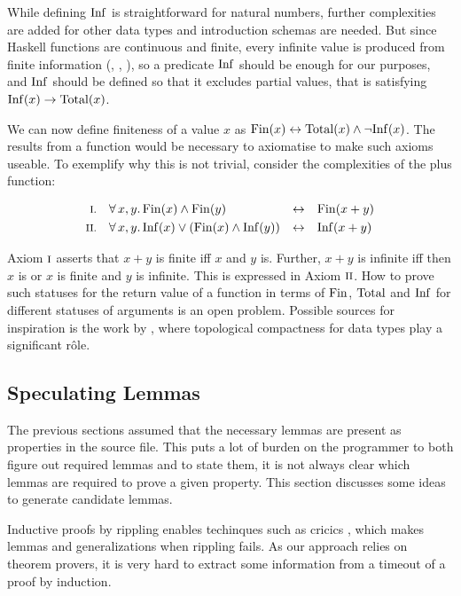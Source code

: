 While defining $\mathrm{Inf}$ is straightforward for natural numbers, further
complexities are added for other data types and introduction schemas
are needed. But since Haskell functions are continuous and finite,
every infinite value is produced from finite information (,
, ), so a predicate $\mathrm{Inf}$ should be enough
for our purposes, and $\mathrm{Inf}$ should be defined so that it excludes
partial values, that is satisfying $\mathrm{Inf}(x) \rightarrow \mathrm{Total}(x)$.

\pagebreak

We can now define finiteness of a value $x$ as
$\mathrm{Fin}(x) \leftrightarrow \mathrm{Total}(x) \wedge \neg \mathrm{Inf}(x)$.  The results
from a function would be necessary to axiomatise to make such axioms
useable. To exemplify why this is not trivial, consider the
complexities of the plus function:

\begin{align*}
\rom{1} && \faa{x}{y} & \Fin(x) \wedge \Fin(y)                  & \leftrightarrow &&& \Fin(x + y) \\
\rom{2} && \faa{x}{y} & \Inf(x) \vee (\Fin(x) \wedge \Inf(y)) & \leftrightarrow &&& \Inf(x + y)
\end{align*}

\noindent
Axiom $\romnodot{1}$ asserts that $x + y$ is finite iff $x$ and $y$
is. Further, $x + y$ is infinite iff then $x$ is or $x$ is finite and
$y$ is infinite. This is expressed in Axiom $\romnodot{2}$. How to
prove such statuses for the return value of a function in terms of
$\mathrm{Fin}$, $\mathrm{Total}$ and $\mathrm{Inf}$ for different statuses of arguments is an
open problem. Possible sources for inspiration is the work by
\cite{exhaustiblesets}, where topological compactness for data types
play a significant r\^{o}le.

\subsection{Speculating Lemmas}

The previous sections assumed that the necessary lemmas are present as
properties in the source file. This puts a lot of burden on the
programmer to both figure out required lemmas and to state them, it is
not always clear which lemmas are required to prove a given
property. This section discusses some ideas to generate candidate
lemmas.

Inductive proofs by rippling enables techinques such as cricics
\citep{productiveuse}, which makes lemmas and generalizations when
rippling fails. As our approach relies on theorem provers, it is very
hard to extract some information from a timeout of a proof by induction.

